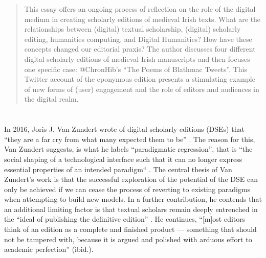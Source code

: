 
\begin{paper}

\begin{abstract}
This essay offers an ongoing process of reflection on the role of the digital medium in creating scholarly editions of medieval Irish texts. What are the relationships between (digital) textual scholarship, (digital) scholarly editing, humanities computing, and Digital Humanities? How have these concepts changed our editorial praxis? The author discusses four different digital scholarly editions of medieval Irish manuscripts and then focuses one specific case: @ChronHib's “The Poems of Blathmac Tweets”. This Twitter account of the eponymous edition presents a stimulating example of new forms of (user) engagement and the role of editors and audiences in the digital realm.\end{abstract}

\section*{} 
In 2016, Joris J. Van Zundert wrote of digital scholarly editions (DSEs) that ``they are a far cry from what many expected them to be'' \citep[899]{zundert_case_2016}.  The reason for this, Van Zundert suggests, is what he labels ``paradigmatic regression'', that is ``the social shaping of a technological interface such that it can no longer express essential properties of an intended paradigm`` \citep[901]{zundert_case_2016}. The central thesis of Van Zundert’s work is that the successful exploration of the potential of the DSE can only be achieved if we can cease the process of reverting to existing paradigms when attempting to build new models. In a further contribution, he contends that an additional limiting factor is that textual scholars remain deeply entrenched in the ``ideal of publishing the definitive edition'' \citep[5: 12]{zundert_mirador_2018}. He continues, ``[m]ost editors think of an edition as a complete and finished product — something that should not be tampered with, because it is argued and polished with arduous effort to academic perfection'' (ibid.). 


\end{paper}
